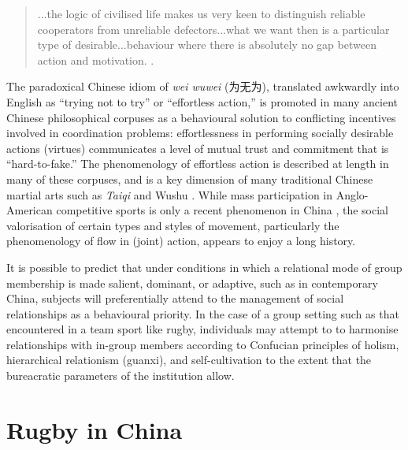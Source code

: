 \begin{CJK}{UTF8}{gbsn}
\begin{quotation}
   ...the logic of civilised life makes us very keen to distinguish reliable cooperators from unreliable defectors...what we want then is a particular type of desirable...behaviour where there is absolutely no gap between action and motivation.  \citep[192]{Slingerland2014}.
\end{quotation}

The paradoxical Chinese idiom of \textit{wei wuwei} (为无为), translated awkwardly into English as ``trying not to try'' or ``effortless action,'' is promoted in many ancient Chinese philosophical corpuses as a behavioural solution to conflicting incentives involved in coordination problems: effortlessness in performing socially desirable actions (virtues) communicates a level of mutual trust and commitment that is ``hard-to-fake.''  The phenomenology of effortless action is described at length in many of these corpuses, and is a key dimension of many traditional Chinese martial arts such as \textit{Taiqi} and Wushu \citep{Morris1998}.  While mass participation in Anglo-American competitive sports is only a recent phenomenon in China \citep{Brownell2008}, the social valorisation of certain types and styles of movement, particularly the phenomenology of flow in (joint) action, appears to enjoy a long history.










It is possible to predict that under conditions in which a relational mode of group membership is made salient, dominant, or adaptive, such as in contemporary China, subjects will preferentially attend to the management of social relationships as a behavioural priority.  In the case of a group setting such as that encountered in a team sport like rugby, individuals may attempt to to harmonise relationships with in-group members according to Confucian principles of holism, hierarchical relationism (guanxi), and self-cultivation to the extent that the bureacratic parameters of the institution allow.













\section{Rugby in China}


\end{CJK}
